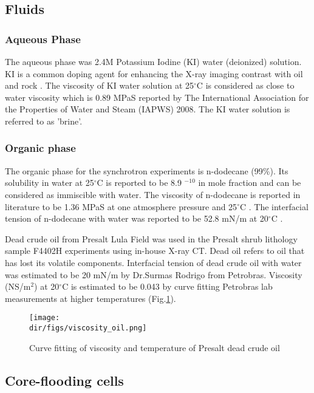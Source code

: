 \subsection{Fluids}
\subsubsection{Aqueous Phase}
The aqueous phase was 2.4M Potassium Iodine (KI) water (deionized) solution. KI is a common doping agent for enhancing the X-ray imaging contrast with oil and rock \citep[e.g.]{iglauer2011residual,culligan2006pore,porter2010measurement}. The viscosity of KI water solution at 25$^{\circ}$C is considered as close to water viscosity which is 0.89 MPaS reported by The International Association for the Properties of Water and Steam (IAPWS) 2008. The KI water solution is referred to as 'brine'.

\subsubsection{Organic phase}
The organic phase for the synchrotron experiments is n-dodecane (99\%). Its solubility in water at 25$^{\circ}$C is reported to be 8.9 $^{-10}$ in mole fraction \citep{shaw2006iupac} and can be considered as immiscible with water. The viscosity of n-dodecane is reported in literature to be 1.36 MPaS at one atmosphere pressure and 25$^{\circ}$C \citep{liu2011measurement}. The interfacial tension of n-dodecane with water was reported to be 52.8 mN/m at 20$^{\circ}$C \citep{zeppieri2001interfacial}.

Dead crude oil from Presalt Lula Field was used in the Presalt shrub lithology sample F4402H experiments using in-house X-ray \textmu CT. Dead oil refers to oil that has lost its volatile components. Interfacial tension of dead crude oil with water was estimated to be 20 mN/m by Dr.Surmas Rodrigo from Petrobras. Viscosity (NS/m$^2$) at 20$^{\circ}$C is estimated to be 0.043 by curve fitting Petrobras lab measurements at higher temperatures (Fig.\ref{viscosity}).

\begin{figure}[htbp]
  \centering
  \texttt{[image: \\dir/figs/viscosity\_oil.png]}
  \caption{Curve fitting of viscosity and temperature of Presalt dead crude oil}
  \label{viscosity}
\end{figure}

\subsection{Core-flooding cells}

